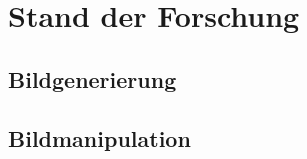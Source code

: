 \chapter{Stand der Forschung}\label{chp:forschungsstand}
\glsresetall
\section{Bildgenerierung}
\section{Bildmanipulation}